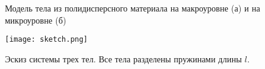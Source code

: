 \begin{figure}[h]
    \begin{minipage}[h]{0.3\linewidth}
    \end{minipage}
    \hfill  
    \begin{minipage}[h]{0.3\linewidth}
    \end{minipage}
    \caption{Модель тела из полидисперсного материала на макроуровне (а) и на микроуровне (б)}
    \label{fig:micmac}
\end{figure}


\begin{figure}[h]
    \centering
    \texttt{[image: sketch.png]}
    \caption{Эскиз системы трех тел. Все тела разделены пружинами длины $l$.}
    \label{fig:sketch}
\end{figure}

